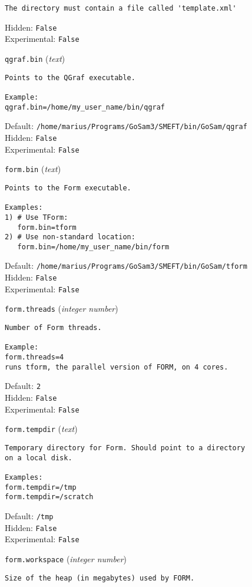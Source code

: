 \begin{basedescript}{\desclabelstyle{\pushlabel}}
\begin{verbatim}
The directory must contain a file called 'template.xml'
\end{verbatim}
Hidden: \verb|False|
\\Experimental: \verb|False|
\\\item[\colorbox{gray!30}{\texttt{qgraf.bin}}] (\textit{text})
\begin{verbatim}
Points to the QGraf executable.

Example:
qgraf.bin=/home/my_user_name/bin/qgraf
\end{verbatim}
Default: \verb|/home/marius/Programs/GoSam3/SMEFT/bin/GoSam/qgraf|
\\Hidden: \verb|False|
\\Experimental: \verb|False|
\\\item[\colorbox{gray!30}{\texttt{form.bin}}] (\textit{text})
\begin{verbatim}
Points to the Form executable.

Examples:
1) # Use TForm:
   form.bin=tform
2) # Use non-standard location:
   form.bin=/home/my_user_name/bin/form
\end{verbatim}
Default: \verb|/home/marius/Programs/GoSam3/SMEFT/bin/GoSam/tform|
\\Hidden: \verb|False|
\\Experimental: \verb|False|
\\\item[\colorbox{gray!30}{\texttt{form.threads}}] (\textit{integer number})
\begin{verbatim}
Number of Form threads.

Example:
form.threads=4
runs tform, the parallel version of FORM, on 4 cores.
\end{verbatim}
Default: \verb|2|
\\Hidden: \verb|False|
\\Experimental: \verb|False|
\\\item[\colorbox{gray!30}{\texttt{form.tempdir}}] (\textit{text})
\begin{verbatim}
Temporary directory for Form. Should point to a directory
on a local disk.

Examples:
form.tempdir=/tmp
form.tempdir=/scratch
\end{verbatim}
Default: \verb|/tmp|
\\Hidden: \verb|False|
\\Experimental: \verb|False|
\\\item[\colorbox{gray!30}{\texttt{form.workspace}}] (\textit{integer number})
\begin{verbatim}
Size of the heap (in megabytes) used by FORM.


\end{verbatim}
\end{basedescript}
